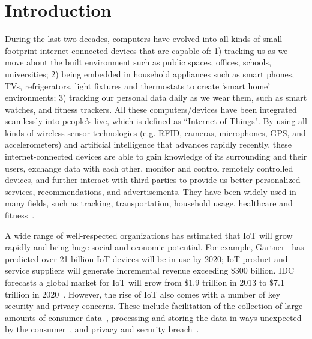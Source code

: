 \chapter{Introduction}\label{chapter:intro}
During the last two decades, computers have evolved into all kinds of small footprint internet-connected devices that are capable of: 1) tracking us as we move about the built environment such as public spaces, offices, schools, universities; 2) being embedded in household appliances such as smart phones, TVs, refrigerators, light fixtures and thermostats to create `smart home' environments; 3) tracking our personal data daily as we wear them, such as smart watches, and fitness trackers. All these computers/devices have been integrated seamlessly into people's live, which is defined as ``Internet of Things". By using all kinds of wireless sensor technologies (e.g. RFID, cameras, microphones, GPS, and accelerometers) and artificial intelligence that advances rapidly recently, these internet-connected devices are able to gain knowledge of its surrounding and their users, exchange data with each other, monitor and control remotely controlled devices, and further interact with third-parties to provide us better personalized services, recommendations, and advertisements. They have been widely used in many fields, such as tracking, transportation, household usage, healthcare and fitness~\cite{li2011smart, solima2016object, kelly2013towards, jia2012rfid, hassanalieragh2015health}.

A wide range of well-respected organizations has estimated that IoT will grow rapidly and bring huge social and economic potential. For example, Gartner~\cite{eddy2015gartner} has predicted over 21 billion IoT devices will be in use by 2020; IoT product and service suppliers will generate incremental revenue exceeding \$300 billion. IDC forecasts a global market for IoT will grow from \$1.9 trillion in 2013 to \$7.1 trillion in 2020~\cite{press2014idc}. However, the rise of IoT also comes with a number of key security and privacy concerns. These include facilitation of the collection of large amounts of consumer data~\cite{weinberg2015internet}, processing and storing the data in ways unexpected by the consumer~\cite{lu2014overview}, and privacy and security breach~\cite{lu2014overview, yu2015handling}.


